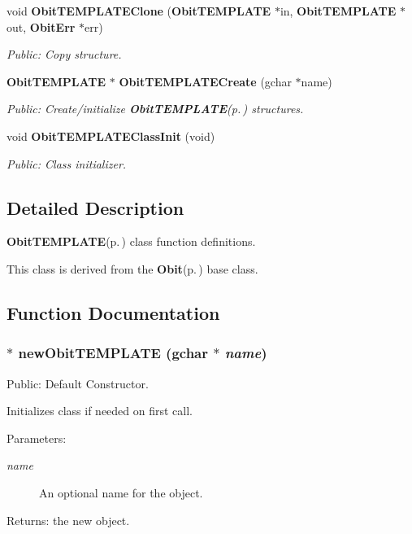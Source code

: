 \begin{CompactItemize}
void {\bf Obit\-TEMPLATEClone} ({\bf Obit\-TEMPLATE} $\ast$in, {\bf Obit\-TEMPLATE} $\ast$out, {\bf Obit\-Err} $\ast$err)
\begin{CompactList}\small\item\em Public: Copy structure. \item\end{CompactList}\item 
{\bf Obit\-TEMPLATE} $\ast$ {\bf Obit\-TEMPLATECreate} (gchar $\ast$name)
\begin{CompactList}\small\item\em Public: Create/initialize {\bf Obit\-TEMPLATE}{\rm (p.\,\pageref{structObitTEMPLATE})} structures. \item\end{CompactList}\item 
void {\bf Obit\-TEMPLATEClass\-Init} (void)
\begin{CompactList}\small\item\em Public: Class initializer. \item\end{CompactList}\end{CompactItemize}


\subsection{Detailed Description}
{\bf Obit\-TEMPLATE}{\rm (p.\,\pageref{structObitTEMPLATE})} class function definitions. 

This class is derived from the {\bf Obit}{\rm (p.\,\pageref{structObit})} base class.

\subsection{Function Documentation}
\subsubsection{$\ast$ new\-Obit\-TEMPLATE (gchar $\ast$ {\em name})}\label{ObitTEMPLATE_8c_a6}


Public: Default Constructor. 

Initializes class if needed on first call. \begin{Desc}
\item[Parameters:]
\begin{description}
\item[{\em name}]An optional name for the object. \end{description}
\end{Desc}
\begin{Desc}
\item[Returns:]the new object. \end{Desc}
